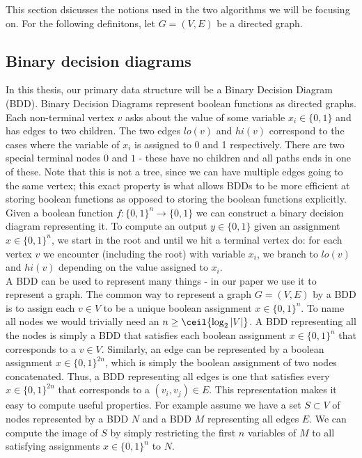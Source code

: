 \documentclass[../master/master.tex]{subfiles}
\begin{document}
This section dsicusses the notions used in the two algorithms we will be focusing on. For the following definitons, let $G=(V,E)$ be a directed graph.

\subsection{Binary decision diagrams}
In this thesis, our primary data structure will be a Binary Decision Diagram (BDD). Binary Decision Diagrams represent boolean functions as directed graphs. Each non-terminal vertex $v$ asks about the value of some variable $x_i\in \{0,1\}$ and has edges to two children. The two edges $lo(v)$ and $hi(v)$ correspond to the cases where the variable of $x_i$ is assigned to 0 and 1 respectively. There are two special terminal nodes $0$ and $1$ - these have no children and all paths ends in one of these. Note that this is not a tree, since we can have multiple edges going to the same vertex; this exact property is what allows BDDs to be more efficient at storing boolean functions as opposed to storing the boolean functions explicitly.
Given a boolean function $f: \{0,1\}^n \rightarrow \{0,1\}$ we can construct a binary decision diagram representing it. To compute an output $y\in \{0,1\}$ given an assignment  $x\in\{0,1\}^n$, we start in the root and until we hit a terminal vertex do: for each vertex $v$ we encounter (including the root) with variable $x_i$, we branch to $lo(v)$ and $hi(v)$ depending on the value assigned to $x_i$. \\[5mm]
A BDD can be used to represent many things - in our paper we use it to represent a graph. The common way to represent a graph $G = (V, E)$ by a BDD is to assign each $v\in V$ to be a unique boolean assignment $x\in\{0,1\}^n$. To name all nodes we would trivially need an $n \geq \ceil{\log_2{|V|}}$. A BDD representing all the nodes is simply a BDD that satisfies each boolean assignment $x\in\{0,1\}^n$ that corresponds to a $v\in V$. Similarly, an edge can be represented by a boolean assignment $x\in\{0,1\}^{2n}$, which is simply the boolean assignment of two nodes concatenated. Thus, a BDD representing all edges is one that satisfies every $x\in\{0,1\}^{2n}$ that corresponds to a $(v_i, v_j)\in E$. This representation makes it easy to compute useful properties. For example assume we have a set $S\subset V$ of nodes represented by a BDD $N$ and a BDD $M$ representing all edges $E$. We can compute the image of $S$ by simply restricting the first $n$ variables of $M$ to all satisfying assignments $x\in\{0,1\}^{n}$ to $N$.
\end{document}
